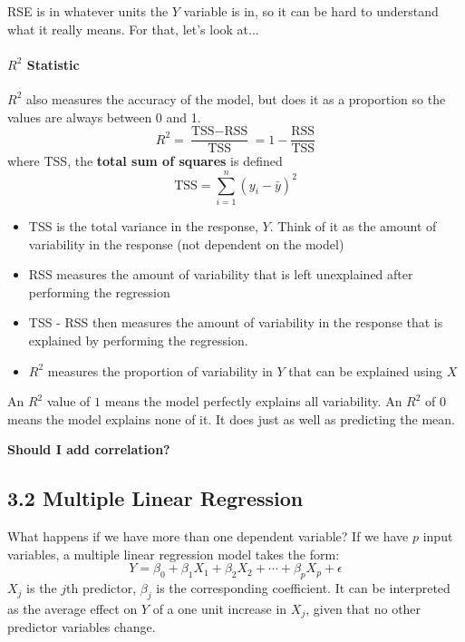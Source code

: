         RSE is in whatever units the $Y$ variable is in, so it can be hard to understand what it really means.   For that, let's look at...
        \paragraph{$R^2$ Statistic\\}
        $R^2$ also measures the accuracy of the model, but does it as a proportion so the values are always between 0 and 1.
        \begin{equation*}\tag{3.17}
            R^2 = \frac{\text{TSS}-\text{RSS}}{\text{TSS}} = 1 - \frac{\text{RSS}}{\text{TSS}}
        \end{equation*}
        where TSS, the \textbf{total sum of squares} is defined
        \begin{equation*}
            \text{TSS} = \sum_{i=1}^n(y_i - \bar y)^2
        \end{equation*}
        \begin{itemize}
            \tightlist
            \item TSS is the total variance in the response, $Y$.  Think of it as the amount of variability in the response (not dependent on the model)
            \item RSS measures the amount of variability that is left unexplained after performing the regression
            \item TSS - RSS then measures the amount of variability in the response that is explained by performing the regression.
            \item $R^2$ measures the proportion of variability in $Y$ that can be explained using $X$
        \end{itemize}
        An $R^2$ value of $1$ means the model perfectly explains all variability.  An $R^2$ of $0$ means the model explains none of it.  It does just as well as predicting the mean.
        
        \textbf{Should I add correlation?}
        
        \subsection*{3.2 Multiple Linear  Regression}\label{multiple-linear-regression}
        What happens if we have more than one dependent variable?  If we have $p$ input variables, a multiple linear regression model takes the form:
        \begin{equation*}\tag{3.19}
            Y = \beta_0 + \beta_1 X_1 + \beta_2 X_2 + \cdots + \beta_p X_p + \epsilon
         \end{equation*}
         $X_j$ is the $j$th predictor, $\beta_j$ is the corresponding coefficient.  It can be interpreted as the average effect on $Y$ of a one unit increase in $X_j$, given that no other predictor variables change.
        
